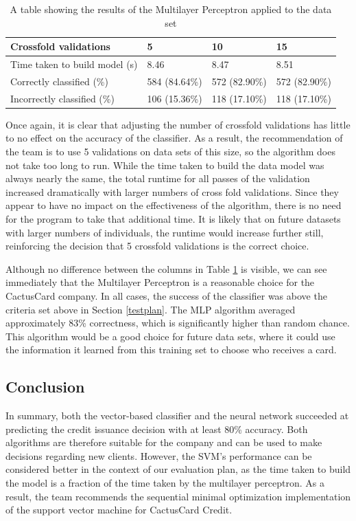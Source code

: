 \documentclass[11pt,journal]{IEEEtran}
\begin{document}
\begin{table}[H]
{\renewcommand{\arraystretch}{1.2}%
	\begin{tabular}{ | p{2.5cm} | l | l | l | }
\hline
Crossfold validations         & 5             & 10            & 15            \\ \hline
Time taken to build model (s) & 8.46          & 8.47          & 8.51          \\ \hline
Correctly classified (\%)     & 584 (84.64\%) & 572 (82.90\%) & 572 (82.90\%) \\ \hline
Incorrectly classified (\%)   & 106 (15.36\%) & 118 (17.10\%) &           118 (17.10\%)  \\ \hline
\end{tabular}
} \quad
\caption{A table showing the results of the Multilayer Perceptron applied to the data set}
\label{fig:mlp}
\end{table}

Once again, it is clear that adjusting the number of crossfold validations has little to no effect on the accuracy of the classifier. As a result, the recommendation of the team is to use 5 validations on data sets of this size, so the algorithm does not take too long to run. While the time taken to build the data model was always nearly the same, the total runtime for all passes of the validation increased dramatically with larger numbers of cross fold validations. Since they appear to have no impact on the effectiveness of the algorithm, there is no need for the program to take that additional time. It is likely that on future datasets with larger numbers of individuals, the runtime would increase further still, reinforcing the decision that 5 crossfold validations is the correct choice.
\par
Although no difference between the columns in Table \ref{fig:mlp} is visible, we can see immediately that the Multilayer Perceptron is a reasonable choice for the CactusCard company. In all cases, the success of the classifier was above the criteria set above in Section \ref{testplan}. The MLP algorithm averaged approximately 83\% correctness, which is significantly higher than random chance. This algorithm would be a good choice for future data sets, where it could use the information it learned from this training set to choose who receives a card.

\subsection{Conclusion}
In summary, both the vector-based classifier and the neural network succeeded at predicting the credit issuance decision with at least 80\% accuracy. Both algorithms are therefore suitable for the company and can be used to make decisions regarding new clients. However, the SVM's performance can be considered better in the context of our evaluation plan, as the time taken to build the model is a fraction of the time taken by the multilayer perceptron. As a result, the team recommends the sequential minimal optimization implementation of the support vector machine for CactusCard Credit.
\end{document}
